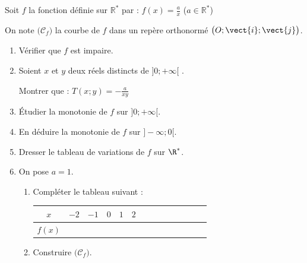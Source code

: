 \begin{Activite}[][10 min]
Soit $f$ la fonction définie sur $\mathbb{R^*}$ par : $f(x) = \frac{a}{x}$ \quad ($a \in \mathbb{R}^*$)

On note $\big(\mathcal{C}_f\big)$ la courbe de $f$ dans un repère orthonormé $\big(O; \vect{i}; \vect{j}\big)$.
\begin{multicols}{2}
\begin{enumerate}
    \item Vérifier que $f$ est impaire.
    \item Soient $x$ et $y$ deux réels distincts de $]0; +\infty[$ .

    Montrer que : \quad $T(x;y) = -\frac{a}{xy} $
    \item Étudier la monotonie de $f$ sur $]0 ; +\infty[$.
    \item En déduire la monotonie de $f$ sur $]-\infty ; 0[$.
    \item Dresser le tableau de variations de $f$ sur $\R^*$.
    \item On pose $a=1$.
    \begin{enumerate}
        \item Compléter le tableau suivant :
        \vspace{0.1cm}
         \begin{center}
            \renewcommand{\arraystretch}{1.2}
            \begin{tabular}{|Sc|*{6}{Sc|}}
                \hline
                $x$    & $-2$ & $-1$ & $0$ & $1$ & $2$  \\ \hline
                $f(x)$ &       &       &     &   &    \\
                \hline
            \end{tabular}
        \end{center}
        \vspace{0.1cm}
        \item Construire $\big(\mathcal{C}_f\big)$.
    \end{enumerate}
\end{enumerate}
\end{multicols}
\end{Activite}

